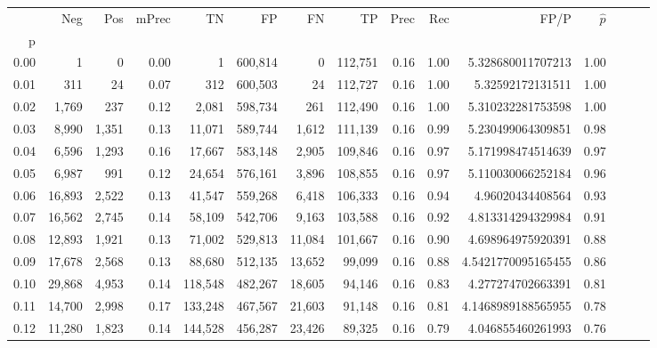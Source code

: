 \begin{tabular}{rrrrrrrrrrrrrrr}
\toprule
{} &     Neg &    Pos & mPrec &       TN &       FP &       FN &       TP &  Prec &   Rec &                    FP/P & $\hat{p}$ \\
p    &         &        &       &          &          &          &          &       &       &                         &           \\
\midrule
0.00 &       1 &      0 &  0.00 &        1 &  600,814 &        0 &  112,751 &  0.16 &  1.00 &       5.328680011707213 &      1.00 \\
0.01 &     311 &     24 &  0.07 &      312 &  600,503 &       24 &  112,727 &  0.16 &  1.00 &        5.32592172131511 &      1.00 \\
0.02 &   1,769 &    237 &  0.12 &    2,081 &  598,734 &      261 &  112,490 &  0.16 &  1.00 &       5.310232281753598 &      1.00 \\
0.03 &   8,990 &  1,351 &  0.13 &   11,071 &  589,744 &    1,612 &  111,139 &  0.16 &  0.99 &       5.230499064309851 &      0.98 \\
0.04 &   6,596 &  1,293 &  0.16 &   17,667 &  583,148 &    2,905 &  109,846 &  0.16 &  0.97 &       5.171998474514639 &      0.97 \\
0.05 &   6,987 &    991 &  0.12 &   24,654 &  576,161 &    3,896 &  108,855 &  0.16 &  0.97 &       5.110030066252184 &      0.96 \\
0.06 &  16,893 &  2,522 &  0.13 &   41,547 &  559,268 &    6,418 &  106,333 &  0.16 &  0.94 &        4.96020434408564 &      0.93 \\
0.07 &  16,562 &  2,745 &  0.14 &   58,109 &  542,706 &    9,163 &  103,588 &  0.16 &  0.92 &       4.813314294329984 &      0.91 \\
0.08 &  12,893 &  1,921 &  0.13 &   71,002 &  529,813 &   11,084 &  101,667 &  0.16 &  0.90 &       4.698964975920391 &      0.88 \\
0.09 &  17,678 &  2,568 &  0.13 &   88,680 &  512,135 &   13,652 &   99,099 &  0.16 &  0.88 &      4.5421770095165455 &      0.86 \\
0.10 &  29,868 &  4,953 &  0.14 &  118,548 &  482,267 &   18,605 &   94,146 &  0.16 &  0.83 &       4.277274702663391 &      0.81 \\
0.11 &  14,700 &  2,998 &  0.17 &  133,248 &  467,567 &   21,603 &   91,148 &  0.16 &  0.81 &      4.1468989188565955 &      0.78 \\
0.12 &  11,280 &  1,823 &  0.14 &  144,528 &  456,287 &   23,426 &   89,325 &  0.16 &  0.79 &       4.046855460261993 &      0.76 \\

\end{tabular}
